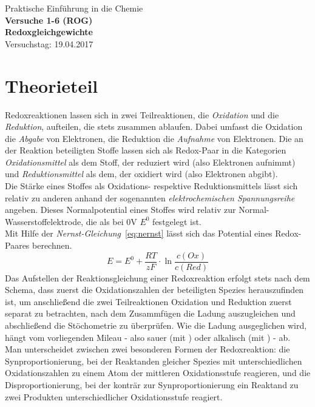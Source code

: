 \documentclass{scrartcl}
\newcommand{\titel}{Praktische Einführung in die Chemie}
\newcommand{\versuch}{1-6 (ROG)}
\newcommand{\subtitel}{Redoxgleichgewichte}
\newcommand{\vtag}{Versuchstag: 19.04.2017}
\begin{document}
\begin{titlepage}
	\begin{center}
		\Large{\titel} \\ \vspace{30pt}
		\LARGE{\textbf{Versuche \versuch}} \\
		\LARGE{\textbf{\subtitel}} \\ 
		\vfill
		\vspace{100pt}
		\vtag
	\end{center}
\end{titlepage}
\section{Theorieteil}
Redoxreaktionen lassen sich in zwei Teilreaktionen, die \emph{Oxidation} und die \emph{Reduktion}, aufteilen, die stets zusammen ablaufen. Dabei umfasst die Oxidation die \emph{Abgabe} von Elektronen, die Reduktion die \emph{Aufnahme} von Elektronen. Die an der Reaktion beteiligten Stoffe lassen sich als Redox-Paar in die Kategorien \emph{Oxidationsmittel} als dem Stoff, der reduziert wird (also Elektronen aufnimmt) und \emph{Reduktionsmittel} als dem, der oxidiert wird (also Elektronen abgibt). \\
Die Stärke eines Stoffes als Oxidations- respektive Reduktionsmittels lässt sich relativ zu anderen anhand der sogenannten \emph{elektrochemischen Spannungsreihe} angeben. Dieses Normalpotential eines Stoffes wird relativ zur Normal-Wasserstoffelektrode, die als  bei 0V $E^0$ festgelegt ist.  \\
Mit Hilfe der \emph{Nernst-Gleichung}~\ref{eq:nernst} lässt sich das Potential eines Redox-Paares  berechnen.
\begin{equation} \label{eq:nernst}
	E = E^0 + \frac{RT}{zF}\cdot \ln{\frac{c(Ox)}{c(Red)}}
\end{equation}
Das Aufstellen der Reaktionsgleichung einer Redoxreaktion erfolgt stets nach dem Schema, dass zuerst die Oxidationszahlen der beteiligten Spezies herauszufinden ist, um anschließend die zwei Teilreaktionen Oxidation und Reduktion zuerst separat zu betrachten, nach dem Zusammfügen die Ladung auszugleichen und abschließend die Stöchometrie zu überprüfen. Wie die Ladung ausgeglichen wird, hängt vom vorliegenden Mileau - also sauer (mit ) oder alkalisch (mit ) - ab. \\
Man unterscheidet zwischen zwei besonderen Formen der Redoxreaktion: die Synproportionierung, bei der Reaktanden gleicher Spezies mit unterschiedlichen Oxidationszahlen zu einem Atom der mittleren Oxidationsstufe reagieren, und die Disproportionierung, bei der konträr zur Synproportionierung ein Reaktand zu zwei Produkten unterschiedlicher Oxidationsstufe reagiert.
\end{document}
